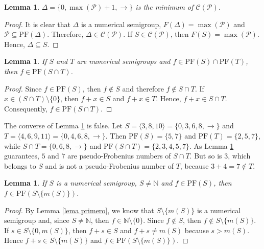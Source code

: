 \documentclass[11pt]{article}
\def\N{\mathbb{N}}
\newtheorem{lemma}[theorem]{Lemma}
\numberwithin{equation}{section}
\newcommand{\PF}{\mathrm{PF}}
\begin{document}
\begin{lemma} \label{lema delta es el minimo}
    $\Delta=\{0,\max(\mathcal P)+1,\rightarrow\}$ is the minimum of $\mathcal C(\mathcal P)$.
\end{lemma}

\begin{proof}
    It is clear that $\Delta$ is a numerical semigroup, $F(\Delta)=\max(\mathcal P)$ and $\mathcal P\subseteq\mathrm{PF}(\Delta)$. Therefore, $\Delta\in\mathcal C(\mathcal P)$. If $S\in\mathcal C(\mathcal P)$, then $F(S)=\max(\mathcal P)$. Hence, $\Delta\subseteq S$.
\end{proof}

\begin{lemma}\label{lema interseccion pseudo-Frobenius}
    If $S$ and $T$ are numerical semigroups and $f\in\mathrm{PF}(S)\cap\mathrm{PF}(T)$, then $f\in\mathrm{PF}(S\cap T)$.
\end{lemma}

\begin{proof}
    Since $f\in\mathrm{PF}(S)$, then $f\notin S$ and therefore $f\notin S\cap T$. If $x\in (S\cap T)\setminus\{0\}$, then $f+x\in S$ and $f+x\in T$. Hence, $f+x\in S\cap T$. Consequently, $f\in\mathrm{PF}(S\cap T)$.
\end{proof}

\noindent The converse of Lemma \ref{lema interseccion pseudo-Frobenius} is false. Let $S=\langle 3,8,10\rangle=\{0,3,6,8,\rightarrow\}$ and $T=\langle 4,6,9,11\rangle=\{0,4,6,8,\rightarrow\}$. Then $\PF(S)=\{5,7\}$ and $\PF(T)=\{2,5,7\}$, while $S\cap T=\{0,6,8,\rightarrow\}$ and $\PF(S\cap T)=\{2,3,4,5,7\}$. As Lemma \ref{lema interseccion pseudo-Frobenius} guarantees, $5$ and $7$ are pseudo-Frobenius numbers of $S\cap T$. But so is $3$, which belongs to $S$ and is not a pseudo-Frobenius number of $T$, because $3+4=7\notin T$.

\begin{lemma}\label{lema pseudo-Frobenius sin multiplicidad}
    If $S$ is a numerical semigroup, $S\ne \N$ and $f\in\mathrm{PF}(S)$, then $f\in\mathrm{PF}(S\setminus\{m(S)\})$.
\end{lemma}

\begin{proof}
    By Lemma \ref{lema primero}, we know that $S\setminus\{m(S)\}$ is a numerical semigroup and, since $S\ne\N$, then $f\in\N\setminus\{0\}$. Since $f\notin S$, then $f\notin S\setminus\{m(S)\}$. If $s\in S\setminus\{0,m(S)\}$, then $f+s\in S$ and $f+s\neq m(S)$ because $s>m(S)$. Hence $f+s\in S\setminus\{m(S)\}$ and $f\in\mathrm{PF}(S\setminus\{m(S)\})$.
\end{proof}
\end{document}

